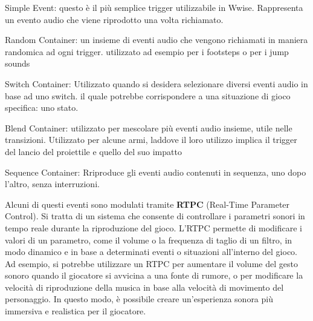 	\begin{compactitem}
		\item Simple Event: questo è il più semplice trigger utilizzabile in Wwise. Rappresenta un evento audio che viene riprodotto una volta richiamato.
		\item Random Container: un insieme di eventi audio che vengono richiamati in maniera randomica ad ogni trigger. utilizzato ad esempio per i footsteps o per i jump sounds
		\item Switch Container: Utilizzato quando si desidera selezionare diversi eventi audio in base ad uno switch. il quale potrebbe corrispondere a una situazione di gioco specifica: uno stato.
		\item Blend Container: utilizzato per mescolare più eventi audio insieme, utile nelle transizioni. Utilizzato per alcune armi, laddove il loro utilizzo implica il trigger del lancio del proiettile e quello del suo impatto
		\item Sequence Container: Rriproduce gli eventi audio contenuti in sequenza, uno dopo l'altro, senza interruzioni.
	\end{compactitem}
	
	Alcuni di questi eventi sono modulati tramite \textbf{RTPC} (Real-Time Parameter Control). Si tratta di un sistema che consente di controllare i parametri sonori in tempo reale durante la riproduzione del gioco. 
	L'RTPC permette di modificare i valori di un parametro, come il volume o la frequenza di taglio di un filtro, in modo dinamico e in base a determinati eventi o situazioni all'interno del gioco. Ad esempio, si potrebbe utilizzare un RTPC per aumentare il volume del gesto sonoro quando il giocatore si avvicina a una fonte di rumore, o per modificare la velocità di riproduzione della musica in base alla velocità di movimento del personaggio. In questo modo, è possibile creare un'esperienza sonora più immersiva e realistica per il giocatore.
	
